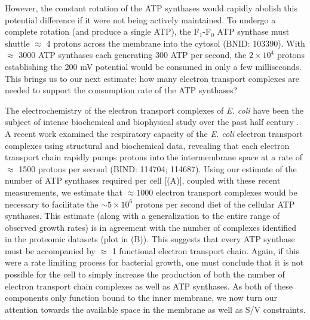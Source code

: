 However, the constant rotation of the ATP synthases would rapidly abolish
this potential difference if it were not being actively maintained. To
undergo a complete rotation (and produce a single ATP), the F$_1$-F$_0$ ATP
synthase must shuttle $\approx$ 4 protons across the membrane into the
cytosol (BNID: 103390). With $\approx$ 3000 ATP synthases each
generating 300 ATP per second, the $2 \times 10^4$ protons establishing the 200
mV potential would be consumed in only a few milliseconds. This brings us
to our next estimate: how many electron transport complexes are needed to
support the consumption rate of the ATP synthases?

The electrochemistry of the electron transport complexes of \textit{E. coli}
have been the subject of intense biochemical and biophysical study over the past
half century \citep{ingledew1984, khademian2017,cox1970,henkel2014}. A recent
work \citep{szenk2017} examined the respiratory capacity of the \textit{E. coli}
electron transport complexes using structural and biochemical data, revealing
that each electron transport chain rapidly pumps protons into the intermembrane
space at a rate of $\approx$ 1500 protons per second (BIND: 114704; 114687). Using our estimate of the number of ATP synthases required per
cell [(A)], coupled with these recent measurements, we
estimate that $\approx 1000$ electron transport complexes would be necessary to
facilitate the $\sim 5 \times 10^6$ protons per second diet of the cellular
ATP synthases. This estimate (along with a generalization to the entire range of
observed growth rates) is in agreement with the number of complexes
identified in the proteomic datasets (plot in (B)). This
suggests that every ATP synthase must be accompanied by $\approx$ 1 functional
electron transport chain. Again, if this were a rate limiting process for
bacterial growth, one must conclude that it is not possible for the cell to
simply increase the production of both the number of electron transport chain
complexes as well as ATP synthases. As both of these components only function
bound to the inner membrane, we now turn our attention towards the available
space in the membrane as well as S/V constraints.


